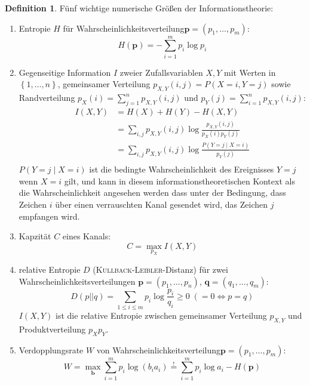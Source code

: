 \documentclass[a4paper]{scrartcl}
\theoremstyle{plain}
\theoremstyle{definition}
\newtheorem{definition}{Definition}[section]
\theoremstyle{examplestyle}
\newcommand\WK{Wahrscheinlichkeit\xspace}
\newcommand\WV{Wahrscheinlichkeitsverteilung\xspace}
\newcommand\ZV{Zufallsvariable\xspace}
\begin{document}
\begin{definition}
	Fünf wichtige numerische Größen der Informationstheorie:
	\begin{enumerate}
	  \item Entropie $H$ für \WV $\mathbf p = \left( p_1, \dots, p_m \right)$:
		\[ H\left( \mathbf p \right) = -\sum_{i=1}^{m} p_i\log p_i \]
	  \item Gegenseitige Information $I$ zweier {\ZV}n $X,Y$ mit Werten in $\left\{ 1, \dots, n \right\}$,
		gemeinsamer Verteilung $p_{X,Y}\left( i,j \right) = P\left( X=i,Y=j \right)$ sowie Randverteilung $p_X\left( i \right) = \sum\limits_{j=1}^n p_{X,Y}\left( i, j \right)$
		und $p_Y\left( j \right) = \sum\limits_{i=1}^n p_{X,Y}\left( i, j \right)$:
		\begin{align*}
		I\left( X, Y \right) & = H\left( X \right) + H\left( Y \right) - H\left( X,Y \right) \\
	  		& = \sum_{i,j}p_{X,Y}\left( i,j \right)\log \frac{p_{X,Y}\left( i,j \right)}{p_X\left( i \right)p_Y\left( j \right)} \\
		  	& = \sum_{i,j}p_{X,Y}\left( i,j \right)\log \frac{P\left( Y=j \mid X=i \right)}{p_Y\left( j \right)} \\
		\end{align*}
		$P\left( Y=j \mid X=i \right)$ ist die bedingte \WK des Ereignisses $Y=j$ wenn $X=i$ gilt, und kann in diesem informationstheoretischen Kontext als die \WK angesehen werden
		dass unter der Bedingung, dass Zeichen $i$ \"uber einen verrauschten Kanal gesendet wird, das Zeichen $j$ empfangen wird.
	  \item Kapzit\"at $C$ eines Kanals:
		\[ C = \max_{p_{X}} I\left( X,Y \right) \]
	  \item relative Entropie $D$ ({\scshape Kullback-Leibler}-Distanz) f\"ur zwei {\WV}en $\mathbf p = \left( p_1, \dots,p_n \right)$, $\mathbf q = \left( q_1, \dots,q_m \right)$:
		\[ D\left( p || q \right) = \sum_{1 \leq i \leq m} p_i \log \frac{p_i}{q_i} \geq 0 \; \left( = 0 \Leftrightarrow p=q \right)\]
		$I\left( X,Y \right)$ ist die relative Entropie zwischen gemeinsamer Verteilung $p_{X,Y}$ und Produktverteilung $p_Xp_Y$.
	  \item Verdopplungsrate $W$ von \WV $\mathbf p = \left( p_1, \dots,p_m \right)$:
		\[ W = \max_{\mathbf b} \sum_{i=1}^m p_i \log\left( b_i a_i \right) \overset{!}{=} \sum_{i=1}^m p_i \log a_i - H\left( \mathbf p \right) \]
	\end{enumerate}
\end{definition}
\end{document}
